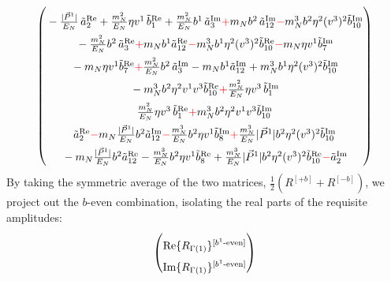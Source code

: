 \begin{widetext}
\begin{align}
\begin{pmatrix}
      \rule{0pt}{16pt}  -\frac{|\vec{P}^1|}{E_N}\, \tilde a^{\text{Re}}_2+ \frac{\mN^2}{E_N} \eta v^1\, \tilde b^{\text{Re}}_1 + \frac{\mN^2}{E_N} \bvec^1\, \tilde a^{\text{Im}}_3\textcolor{red}{+} \mN  \bvec^2 \, \tilde a^{\text{Im}}_{12}\textcolor{red}{-} \mN^3  \bvec^2 \eta^2 (v^3)^2 \tilde b^{\text{Im}}_{10}\\
      \rule{0pt}{16pt}  - \frac{\mN^2}{E_N} \bvec^2\, \tilde a^{\text{Re}}_3
		\textcolor{red}{+}  \mN   \bvec^1  \tilde a^{\text{Re}}_{12}\textcolor{red}{-} \mN^3  \bvec^1 \eta^2 (v^3)^2 \tilde b^{\text{Re}}_{10}\textcolor{red}{-}\mN \eta v^1  \tilde b^{\text{Im}}_7 \\
      \rule{0pt}{16pt} - \mN \eta v^1  \tilde b^{\text{Re}}_7 \textcolor{red}{+}  \frac{\mN^2}{E_N} \bvec^2\, \tilde a^{\text{Im}}_3
		- \mN   \bvec^1  \tilde a^{\text{Im}}_{12} +\mN^3  \bvec^1 \eta^2 (v^3)^2 \tilde b^{\text{Im}}_{10}\\
      \rule{0pt}{16pt}-\mN^3 \bvec^2 \eta^2 v^1 v^3\tilde b^{\text{Re}}_{10}\textcolor{red}{+}\frac{\mN^2}{E_N} \eta v^3\, \tilde b^{\text{Im}}_1\\
      \rule{0pt}{16pt} \frac{\mN^2}{E_N} \eta v^3\, \tilde b^{\text{Re}}_1 \textcolor{red}{+} \mN^3 \bvec^2 \eta^2 v^1 v^3\tilde b^{\text{Im}}_{10}\\
      \rule{0pt}{16pt}  \tilde a^{\text{Re}}_2 \textcolor{red}{-}  \mN  \frac{|\vec{P}^1|}{E_N} \bvec^2  \tilde a^{\text{Im}}_{12}\textcolor{red}{-} \frac{  \mN^3}{E_N}  \bvec^2 \eta v^1  \tilde b^{\text{Im}}_8\textcolor{red}{+} \frac{ \mN^3}{E_N}  |\vec{P}^1| \bvec^2 \eta^2 (v^3)^2 \tilde b^{\text{Im}}_{10}\\
      \rule{0pt}{16pt} - \mN  \frac{|\vec{P}^1|}{E_N} \bvec^2  \tilde a^{\text{Re}}_{12}- \frac{  \mN^3}{E_N}  \bvec^2 \eta v^1  \tilde b^{\text{Re}}_8 + \frac{ \mN^3}{E_N}  |\vec{P}^1| \bvec^2 \eta^2 (v^3)^2 \tilde b^{\text{Re}}_{10}\textcolor{red}{-}\tilde a^{\text{Im}}_2
    \end{pmatrix}
\end{align}
By taking the symmetric average of the two matrices, $\frac{1}{2}\left(R^{[+b]} + R^{[-b]}\right)$, we project out the $b$-even combination, isolating the real parts of the requisite amplitudes:
\begin{align}
    \begin{pmatrix}
        \rule{0pt}{16pt} \text{Re}\{ R_{\Gamma(1)}\}^{[b^{1}\text{-even}]} \\
        \rule{0pt}{16pt} \text{Im}\{ R_{\Gamma(1)}\}^{[b^{1}\text{-even}]} \\

\end{pmatrix}
\end{align}
\end{widetext}
